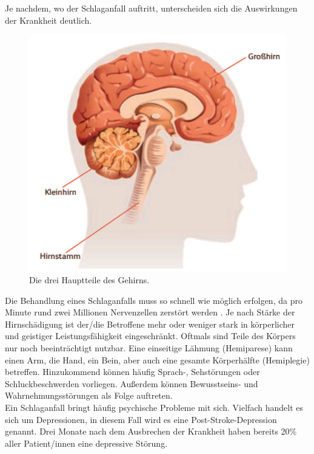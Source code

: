 Je nachdem, wo der Schlaganfall auftritt, unterscheiden sich die Auswirkungen der Krankheit deutlich. \cite{hopkins:2019:stroke_effects} 

\begin{figure}[h]
    \centering
	\includegraphics[width=0.5\linewidth]{figures/stroke/brain_areas}
	\caption{Die drei Hauptteile des Gehirns. \cite{haring:2014:insult}}
	\label{fig:brain_areas}
\end{figure}

Die Behandlung eines Schlaganfalls muss so schnell wie möglich erfolgen, da pro Minute rund zwei Millionen Nervenzellen zerstört werden \cite{haring:2014:insult}. Je nach Stärke der Hirnschädigung ist der/die Betroffene mehr oder weniger stark in körperlicher und geistiger Leistungsfähigkeit eingeschränkt. Oftmals sind Teile des Körpers nur noch beeinträchtigt nutzbar. Eine einseitige Lähmung (Hemiparese) kann einen Arm, die Hand, ein Bein, aber auch eine gesamte Körperhälfte (Hemiplegie) betreffen. Hinzukommend können häufig Sprach-, Sehstörungen oder Schluckbeschwerden vorliegen. Außerdem können Bewusstseins- und Wahrnehmungsstörungen als Folge auftreten. \cite{health:2019:stroke_rehab}\cite{stroke:2019:consequences} \\ 
Ein Schlaganfall bringt häufig psychische Probleme mit sich. Vielfach handelt es sich um Depressionen, in diesem Fall wird es eine Post-Stroke-Depression genannt. Drei Monate nach dem Ausbrechen der Krankheit haben bereits 20\% aller Patient/innen eine depressive Störung. \cite{haring:2014:insult}

